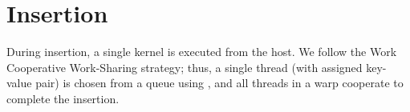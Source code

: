 \section{Insertion}

During insertion, a single kernel is executed from the host. We follow the Work Cooperative Work-Sharing strategy; thus, a single thread (with assigned key-value pair) is chosen from a queue using , and all threads in a warp cooperate to complete the insertion.

